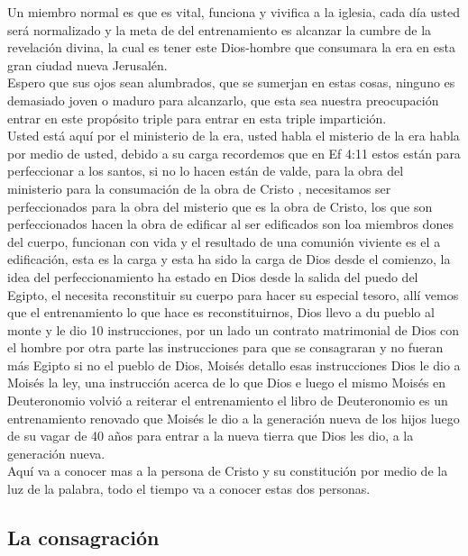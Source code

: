 \documentclass[12pt]{article}
\begin{document}
Un miembro normal es que es vital, funciona y vivifica a la iglesia, cada día usted será normalizado y la meta de del entrenamiento es alcanzar la cumbre de la revelación divina, la cual es tener este Dios-hombre que consumara la era en esta gran ciudad nueva Jerusalén.\\

Espero que sus ojos sean alumbrados, que se sumerjan en estas cosas, ninguno es demasiado joven o maduro para alcanzarlo, que esta sea nuestra preocupación entrar en este propósito triple para entrar en esta triple impartición.\\

Usted está aquí por el ministerio de la era, usted habla el misterio de la era habla por medio de usted, debido a su carga recordemos que en Ef 4:11 estos están para perfeccionar a los santos, si no lo hacen están de valde, para la obra del ministerio para la consumación de la obra de Cristo , necesitamos ser perfeccionados para la obra del misterio que es la obra de Cristo, los que son perfeccionados hacen la obra de edificar al ser edificados son loa miembros dones del cuerpo, funcionan con vida y el resultado de una comunión viviente es el a edificación, esta es la carga y esta ha sido la carga de Dios desde el comienzo, la idea del perfeccionamiento ha estado en Dios desde la salida del puedo del Egipto, el necesita reconstituir su cuerpo para hacer su especial tesoro, allí vemos que el entrenamiento lo que hace es reconstituirnos, Dios llevo a du pueblo al monte y le dio 10 instrucciones, por un lado un contrato matrimonial de Dios con el hombre por otra parte las instrucciones para que se consagraran y no fueran más Egipto si no el pueblo de Dios, Moisés detallo esas instrucciones Dios le dio a Moisés la ley, una instrucción acerca de lo que Dios e luego el mismo Moisés en Deuteronomio volvió a reiterar el entrenamiento el libro de Deuteronomio es un entrenamiento renovado que Moisés le dio a la generación nueva de los hijos luego de su vagar de 40 años para entrar a la nueva tierra que Dios les dio, a la generación nueva.\\

Aquí va a conocer mas a la persona de Cristo y su constitución por medio de la luz de la palabra, todo el tiempo va a conocer estas dos personas.\\

\subsection*{La consagración}
\end{document}

